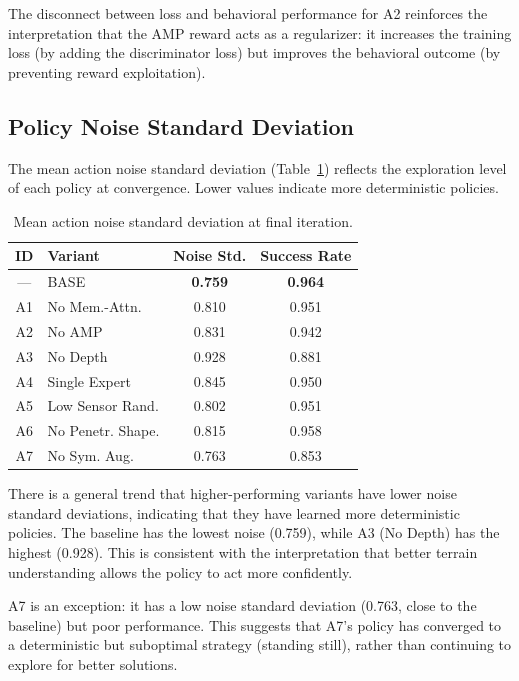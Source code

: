 The disconnect between loss and behavioral performance for A2 reinforces the interpretation that the AMP reward acts as a regularizer: it increases the training loss (by adding the discriminator loss) but improves the behavioral outcome (by preventing reward exploitation).

\subsection{Policy Noise Standard Deviation}

The mean action noise standard deviation (Table~\ref{tab:noise_std}) reflects the exploration level of each policy at convergence. Lower values indicate more deterministic policies.

\begin{table}[t]
\centering
\caption{Mean action noise standard deviation at final iteration.}
\label{tab:noise_std}
\begin{tabular}{clcc}
\toprule
\textbf{ID} & \textbf{Variant} & \textbf{Noise Std.} & \textbf{Success Rate} \\
\midrule
--- & BASE & \textbf{0.759} & \textbf{0.964} \\
A1 & No Mem.-Attn. & 0.810 & 0.951 \\
A2 & No AMP & 0.831 & 0.942 \\
A3 & No Depth & 0.928 & 0.881 \\
A4 & Single Expert & 0.845 & 0.950 \\
A5 & Low Sensor Rand. & 0.802 & 0.951 \\
A6 & No Penetr. Shape. & 0.815 & 0.958 \\
A7 & No Sym. Aug. & 0.763 & 0.853 \\
\bottomrule
\end{tabular}
\end{table}

There is a general trend that higher-performing variants have lower noise standard deviations, indicating that they have learned more deterministic policies. The baseline has the lowest noise (0.759), while A3 (No Depth) has the highest (0.928). This is consistent with the interpretation that better terrain understanding allows the policy to act more confidently.

A7 is an exception: it has a low noise standard deviation (0.763, close to the baseline) but poor performance. This suggests that A7's policy has converged to a deterministic but suboptimal strategy (standing still), rather than continuing to explore for better solutions.

